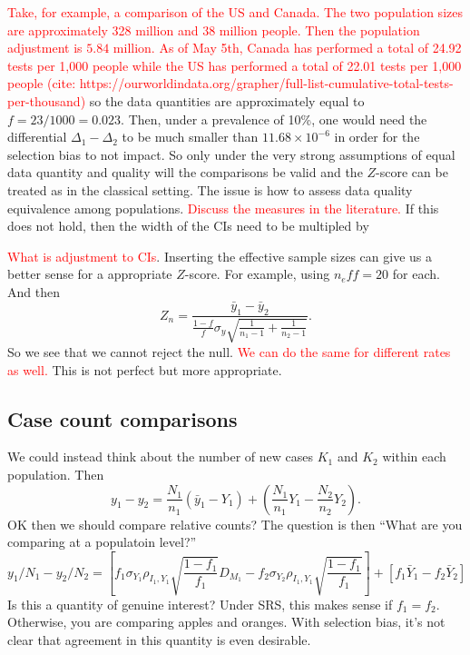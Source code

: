 \documentclass[11pt]{amsart}
\begin{document}
\textcolor{red}{Take, for example, a comparison of the US and Canada.  The two population sizes are approximately 328 million and 38 million people.  Then the population adjustment is $5.84$ million. As of May 5th, Canada has performed a total of 24.92 tests per 1,000 people while the US has performed a total of 22.01 tests per 1,000 people (cite: https://ourworldindata.org/grapher/full-list-cumulative-total-tests-per-thousand)} so the data quantities are approximately equal to $f = 23/1000 = 0.023$.  Then, under a prevalence of 10\%, one would need the differential $\Delta_1-\Delta_2$ to be much smaller than $11.68 \times 10^{-6}$ in order for the selection bias to not impact.  So only under the very strong assumptions of equal data quantity and quality will the comparisons be valid and the $Z$-score can be treated as in the classical setting.  The issue is how to assess data quality equivalence among populations. \textcolor{red}{Discuss the measures in the literature.}  If this does not hold, then the width of the CIs need to be multipled by

\textcolor{red}{What is adjustment to CIs}.   Inserting the effective sample sizes can give us a better sense for a appropriate $Z$-score.  For example, using $n_eff = 20$ for each. And then
$$
Z_n = \frac{\bar y_1 - \bar y_2}{ \frac{1-f}{f} \sigma_y \sqrt{ \frac{1}{n_1 - 1} + \frac{1}{n_2 - 1}}}.
$$
So we see that we cannot reject the null. \textcolor{red}{We can do the same for different rates as well.}  This is not perfect but more appropriate.

\subsection{Case count comparisons}

We could instead think about the number of new cases $K_1$ and $K_2$ within each population.  Then
$$
y_1 - y_2 = \frac{N_1}{n_1} ( \bar y_1 - Y_{1}) + \left( \frac{N_1}{n_1} Y_{1} - \frac{N_2}{n_2} Y_2  \right).
$$
OK then we should compare relative counts?
The question is then ``What are you comparing at a populatoin level?''
$$
y_1/N_1 - y_2/ N_2 = \left[ f_1 \sigma_{Y_1} \rho_{I_1, Y_1} \sqrt{\frac{1-f_1}{f_1}} D_{M_1} - f_2 \sigma_{Y_2} \rho_{I_1, Y_1} \sqrt{\frac{1-f_1}{f_1}}  \right] + \left[ f_1 \bar Y_1 - f_2 \bar Y_2 \right]
$$
Is this a quantity of genuine interest? Under SRS, this makes sense if $f_1 = f_2$.  Otherwise, you are comparing apples and oranges.  With selection bias, it's not clear that agreement in this quantity is even desirable.
\end{document}

